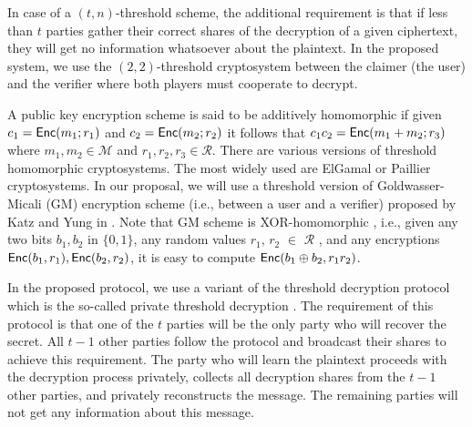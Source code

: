 \documentclass[journal]{IEEEtran}
\begin{document}
In case of a $(t,n)$-threshold scheme, the additional requirement is that if less than $t$ parties gather their correct shares of the decryption of a given ciphertext, they will get no information whatsoever about the plaintext. In the proposed system, we use the $(2,2)$-threshold cryptosystem between the claimer (the user) and the verifier where both players must cooperate to decrypt. 

A public key encryption scheme is said to be additively homomorphic if given $c_1=\text{\sf Enc}(m_1;r_1)$ and $c_2=\text{\sf Enc}(m_2;r_2)$ it follows that $c_1c_2=\text{\sf Enc}(m_1 + m_2;r_3)$ where $m_1, m_2 \in \mathcal{M}$ and $r_1, r_2, r_3 \in \mathcal{R}$. There are various versions of threshold homomorphic cryptosystems. The most widely used are ElGamal \cite{Elgamal} or Paillier \cite{Paillier} cryptosystems. In our proposal, we will use a threshold version of Goldwasser-Micali (GM) encryption scheme (i.e., between a user and a verifier) proposed by Katz and Yung in \cite{KY02}. Note that GM scheme is XOR-homomorphic \cite{GM84}, i.e., given any two bits $b_1, b_2$ in $\{0,1\}$, any random values $r_1$, $r_2$ $\in$ $\mathcal{R}$ , and any encryptions $\text{\sf Enc}(b_1,r_1), \text{\sf Enc}(b_2,r_2)$, it is easy to compute $\text{\sf Enc}(b_1 \oplus b_2, r_1 r_2)$. 

In the proposed protocol, we use a variant of the threshold decryption protocol which is the so-called private threshold decryption \cite{Damgard}. The requirement of this protocol is that one of the $t$ parties will be the only party who will recover the secret. All $t-1$ other parties follow the protocol and broadcast their shares to achieve this requirement. The party who will learn the plaintext proceeds with the decryption process privately, collects all decryption shares from the $t-1$ other parties, and privately reconstructs the message. The remaining parties will not get any information about this message.
\end{document}
